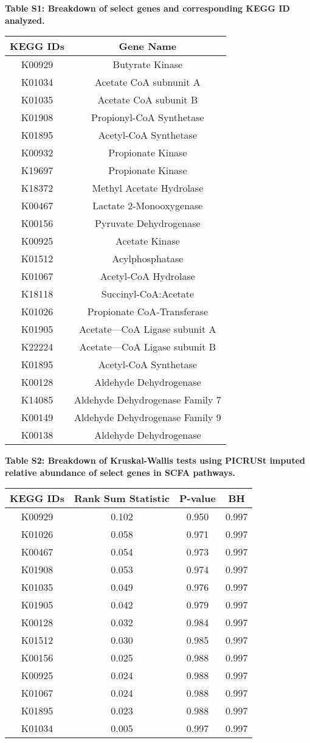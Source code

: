 \documentclass[11pt,]{article}
\title{}
\author{}
\date{}
\begin{document}

\textbf{Table S1: Breakdown of select genes and corresponding KEGG ID
analyzed.}

\begin{longtable}[]{@{}cc@{}}
\toprule
KEGG IDs & Gene Name\tabularnewline
\midrule
\endhead
K00929 & Butyrate Kinase\tabularnewline
K01034 & Acetate CoA subnunit A\tabularnewline
K01035 & Acetate CoA subunit B\tabularnewline
K01908 & Propionyl-CoA Synthetase\tabularnewline
K01895 & Acetyl-CoA Synthetase\tabularnewline
K00932 & Propionate Kinase\tabularnewline
K19697 & Propionate Kinase\tabularnewline
K18372 & Methyl Acetate Hydrolase\tabularnewline
K00467 & Lactate 2-Monooxygenase\tabularnewline
K00156 & Pyruvate Dehydrogenase\tabularnewline
K00925 & Acetate Kinase\tabularnewline
K01512 & Acylphosphatase\tabularnewline
K01067 & Acetyl-CoA Hydrolase\tabularnewline
K18118 & Succinyl-CoA:Acetate\tabularnewline
K01026 & Propionate CoA-Transferase\tabularnewline
K01905 & Acetate---CoA Ligase subunit A\tabularnewline
K22224 & Acetate---CoA Ligase subunit B\tabularnewline
K01895 & Acetyl-CoA Synthetase\tabularnewline
K00128 & Aldehyde Dehydrogenase\tabularnewline
K14085 & Aldehyde Dehydrogenase Family 7\tabularnewline
K00149 & Aldehyde Dehydrogenase Family 9\tabularnewline
K00138 & Aldehyde Dehydrogenase\tabularnewline
\bottomrule
\end{longtable}

\newpage

\textbf{Table S2: Breakdown of Kruskal-Wallis tests using PICRUSt
imputed relative abundance of select genes in SCFA pathways.}

\begin{longtable}[]{@{}cccc@{}}
\toprule
KEGG IDs & Rank Sum Statistic & P-value & BH\tabularnewline
\midrule
\endhead
K00929 & 0.102 & 0.950 & 0.997\tabularnewline
K01026 & 0.058 & 0.971 & 0.997\tabularnewline
K00467 & 0.054 & 0.973 & 0.997\tabularnewline
K01908 & 0.053 & 0.974 & 0.997\tabularnewline
K01035 & 0.049 & 0.976 & 0.997\tabularnewline
K01905 & 0.042 & 0.979 & 0.997\tabularnewline
K00128 & 0.032 & 0.984 & 0.997\tabularnewline
K01512 & 0.030 & 0.985 & 0.997\tabularnewline
K00156 & 0.025 & 0.988 & 0.997\tabularnewline
K00925 & 0.024 & 0.988 & 0.997\tabularnewline
K01067 & 0.024 & 0.988 & 0.997\tabularnewline
K01895 & 0.023 & 0.988 & 0.997\tabularnewline
K01034 & 0.005 & 0.997 & 0.997\tabularnewline
\bottomrule
\end{longtable}

\newpage
\end{document}
